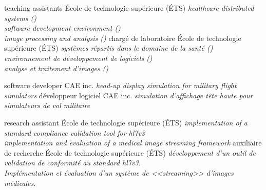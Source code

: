 \documentclass[print]{friggeri-cv}
\begin{document}
\begin{entrylist}
  \engfr
  { {teaching assistants} {École de technologie supérieure {\scriptsize (ÉTS)}} {\emph{healthcare distributed systems (\gtssys)\\software development environment (\eleenv)\\image processing and analysis (\eletr)}}}
  { {chargé de laboratoire} {École de technologie supérieure {\scriptsize (ÉTS)}} {\emph{systèmes répartis dans le domaine de la santé (\gtssys)\\environnement de développement de logiciels (\eleenv)\\analyse et traitement d'images (\eletr)}}}

  \engfr
  { {software developer} {\scriptsize{CAE} inc.} {\emph{head-up display simulation for military flight simulators}}}
  { {développeur logiciel} {\scriptsize{CAE} inc.} {\emph{simulation d'affichage tête haute pour simulateurs de vol militaire}}}

  \engfr
  { {research assistant} {École de technologie supérieure {\scriptsize (ÉTS)}} {\emph{implementation of a standard compliance validation tool for hl{\small7}v{\small3}\\implementation and evaluation of a medical image streaming framework}}}
  { {auxiliaire de recherche} {École de technologie supérieure {\scriptsize (ÉTS)}} {\emph{développement d'un outil de validation de conformité au standard hl{\small7}v{\small3}.\\Implémentation et évaluation d'un système de <<streaming>> d'images médicales.}}}
\end{entrylist}

\end{document}
